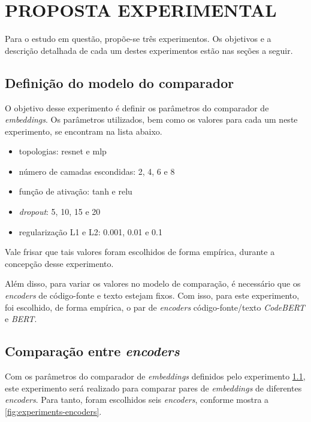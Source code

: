 \label{chp:experiments}
\chapter{PROPOSTA EXPERIMENTAL}

Para o estudo em questão, propõe-se três experimentos. Os objetivos e a descrição detalhada de cada um destes experimentos estão nas seções a seguir.


\section{Definição do modelo do comparador}
\label{sec:experiments:emb-comparator}
O objetivo desse experimento é definir os parâmetros do comparador de \textit{embeddings}. Os parâmetros utilizados, bem como os valores para cada um neste experimento, se encontram na lista abaixo.

\begin{itemize}
    \item topologias: \gls{resnet} e \gls{mlp}
    \item número de camadas escondidas: 2, 4, 6 e 8
    \item função de ativação: \gls{tanh} e \gls{relu}
    \item \textit{dropout}: 5, 10, 15 e 20
    \item regularização L1 e L2: 0.001, 0.01 e 0.1
\end{itemize}

Vale frisar que tais valores foram escolhidos de forma empírica, durante a concepção desse experimento. 

Além disso, para variar os valores no modelo de comparação, é necessário que os \textit{encoders} de código-fonte e texto estejam fixos. Com isso, para este experimento, foi escolhido, de forma empírica, o par de \textit{encoders} código-fonte/texto \textit{CodeBERT} e \textit{BERT}.

\section{Comparação entre \textit{encoders}}
\label{sec:experiments:encoders}
Com os parâmetros do comparador de \textit{embeddings} definidos pelo experimento \ref{sec:experiments:emb-comparator}, este experimento será realizado para comparar pares de \textit{embeddings} de diferentes \textit{encoders}. Para tanto, foram escolhidos seis \textit{encoders}, conforme mostra a \ref{fig:experiments-encoders}.

